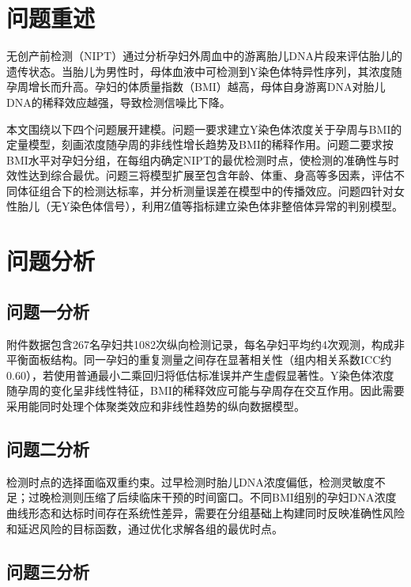 \documentclass{cumcmthesis}
\begin{document}
\newpage
\tableofcontents
\newpage

\section{问题重述}

无创产前检测（NIPT）通过分析孕妇外周血中的游离胎儿DNA片段来评估胎儿的遗传状态。当胎儿为男性时，母体血液中可检测到Y染色体特异性序列，其浓度随孕周增长而升高。孕妇的体质量指数（BMI）越高，母体自身游离DNA对胎儿DNA的稀释效应越强，导致检测信噪比下降。

本文围绕以下四个问题展开建模。问题一要求建立Y染色体浓度关于孕周与BMI的定量模型，刻画浓度随孕周的非线性增长趋势及BMI的稀释作用。问题二要求按BMI水平对孕妇分组，在每组内确定NIPT的最优检测时点，使检测的准确性与时效性达到综合最优。问题三将模型扩展至包含年龄、体重、身高等多因素，评估不同体征组合下的检测达标率，并分析测量误差在模型中的传播效应。问题四针对女性胎儿（无Y染色体信号），利用Z值等指标建立染色体非整倍体异常的判别模型。

\section{问题分析}

\subsection{问题一分析}

附件数据包含267名孕妇共1082次纵向检测记录，每名孕妇平均约4次观测，构成非平衡面板结构。同一孕妇的重复测量之间存在显著相关性（组内相关系数ICC约0.60），若使用普通最小二乘回归将低估标准误并产生虚假显著性。Y染色体浓度随孕周的变化呈非线性特征，BMI的稀释效应可能与孕周存在交互作用。因此需要采用能同时处理个体聚类效应和非线性趋势的纵向数据模型。

\subsection{问题二分析}

检测时点的选择面临双重约束。过早检测时胎儿DNA浓度偏低，检测灵敏度不足；过晚检测则压缩了后续临床干预的时间窗口。不同BMI组别的孕妇DNA浓度曲线形态和达标时间存在系统性差异，需要在分组基础上构建同时反映准确性风险和延迟风险的目标函数，通过优化求解各组的最优时点。

\subsection{问题三分析}
\end{document}
